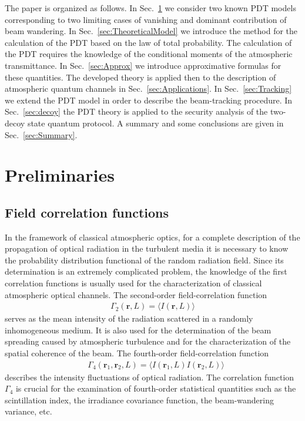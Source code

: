 \documentclass[aps,pra,twocolumn,a4paper,nofootinbib,preprintnumbers] {revtex4-1}
\begin{document}
	The paper is organized as follows. In Sec.~\ref{sec:Preliminaries} we consider two known PDT models  corresponding to two limiting cases of vanishing and dominant contribution of beam wandering.
	In Sec.~\ref{sec:TheoreticalModel} we introduce the  method for the calculation of the PDT based on  the law of total probability.
	The calculation of the PDT requires the knowledge of the conditional moments of the atmospheric transmittance.
	In Sec.~\ref{sec:Approx} we introduce approximative formulas for these quantities.
	The developed theory is applied then to the description of atmospheric quantum channels in Sec.~\ref{sec:Applications}.
	In Sec.~\ref{sec:Tracking} we extend the PDT model in order to describe the beam-tracking procedure.
	In Sec.~\ref{sec:decoy} the PDT theory is applied to the security analysis of the two-decoy state quantum protocol.
	A summary and some conclusions are given in Sec.~\ref{sec:Summary}.






\section{Preliminaries}\label{sec:Preliminaries}
\subsection{Field correlation functions}

	In the framework of classical atmospheric optics, for a complete description of the propagation of optical radiation in the turbulent media it is necessary to know the probability distribution functional of the random radiation field.
	Since its determination is an extremely complicated problem, the knowledge of the first correlation functions is usually used for the characterization of classical atmospheric optical channels.
	The second-order field-correlation function
		\begin{align}\label{Gamma2}
		\Gamma_2(\boldsymbol{r},L)=\langle I(\boldsymbol{r},L)\rangle
		\end{align}
	serves as the mean intensity of the radiation scattered in a randomly inhomogeneous medium.
	It is also used for the  determination of the beam spreading caused by atmospheric turbulence and for the characterization of  the  spatial coherence of the beam.
	The fourth-order field-correlation function
		\begin{align}\label{Gamma4}
		&\Gamma_4(\boldsymbol{r}_1,\boldsymbol{r}_2,L){=}\langle I(\boldsymbol{r}_1,L)I(\boldsymbol{r}_2,L)\rangle
		\end{align}
	describes the intensity fluctuations of optical radiation.
	The correlation function $\Gamma_4$ is crucial for the examination of fourth-order statistical quantities such as the scintillation index, the irradiance covariance function, the beam-wandering variance, etc.
\end{document}
